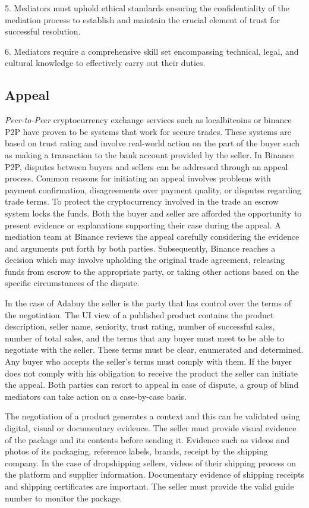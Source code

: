 \documentclass[12pt]{article}
\begin{document}
5. Mediators must uphold ethical standards ensuring the confidentiality of the mediation process to establish and maintain the crucial element of trust for successful resolution.

6. Mediators require a comprehensive skill set encompassing technical, legal, and cultural knowledge to effectively carry out their duties.

\subsection { Appeal } 

\emph{Peer-to-Peer} cryptocurrency exchange services such as localbitcoins or binance P2P have proven to be systems that work for secure trades. These systems are based on trust rating and involve real-world action on the part of the buyer such as making a transaction to the bank account provided by the seller. In Binance P2P, disputes between buyers and sellers can be addressed through an appeal process. Common reasons for initiating an appeal involves problems with payment confirmation, disagreements over payment quality, or disputes regarding trade terms. To protect the cryptocurrency involved in the trade an escrow system locks the funds. Both the buyer and seller are afforded the opportunity to present evidence or explanations supporting their case during the appeal. A mediation team at Binance reviews the appeal carefully considering the evidence and arguments put forth by both parties. Subsequently, Binance reaches a decision which may involve upholding the original trade agreement, releasing funds from escrow to the appropriate party, or taking other actions based on the specific circumstances of the dispute.

In the case of Adabuy the seller is the party that has control over the terms of the negotiation. The UI view of a published product contains the product description, seller name, seniority, trust rating, number of successful sales, number of total sales, and the terms that any buyer must meet to be able to negotiate with the seller. These terms must be clear, enumerated and determined. Any buyer who accepts the seller's terms must comply with them. If the buyer does not comply with his obligation to receive the product the seller can initiate the appeal. Both parties can resort to appeal in case of dispute, a group of blind mediators can take action on a case-by-case basis.

The negotiation of a product generates a context and this can be validated using digital, visual or documentary evidence. The seller must provide visual evidence of the package and its contents before sending it. Evidence such as videos and photos of its packaging, reference labels, brands, receipt by the shipping company. In the case of dropshipping sellers, videos of their shipping process on the platform and supplier information. Documentary evidence of shipping receipts and shipping certificates are important. The seller must provide the valid guide number to monitor the package.
\end{document}
